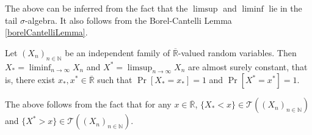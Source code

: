 The above can be inferred from the fact that the $\limsup$ and $\liminf$ lie in the tail $\sigma$-algebra. It also follows from the Borel-Cantelli Lemma \ref{borelCantelliLemma}.

\begin{corollary}
    Let $(X_n)_{n\in\mathbb{N}}$ be an independent family of $\overline{\mathbb{R}}$-valued random variables. Then $X_*=\liminf_{n\to\infty}X_n$ and $X^*=\limsup_{n\to\infty} X_n$ are almost surely constant, that is, there exist $x_*,x^*\in\overline{\mathbb{R}}$ such that $\Pr[X_*=x_*]=1$ and $\Pr[X^*=x^*]=1$.
\end{corollary}

The above follows from the fact that for any $x\in\overline{\mathbb{R}}$, $\{X_*<x\}\in\mathcal{T}((X_n)_{n\in\mathbb{N}})$ and $\{X^*>x\}\in\mathcal{T}((X_n)_{n\in\mathbb{N}})$.

\clearpage